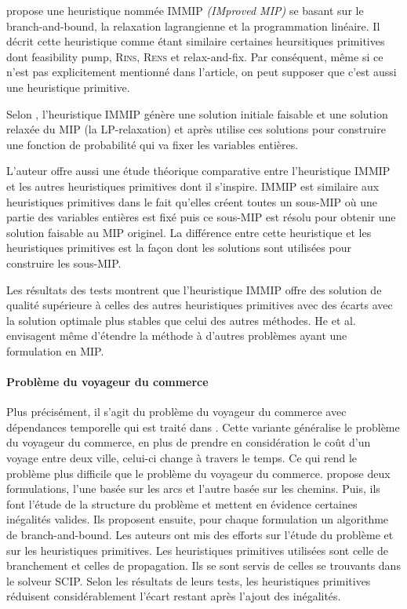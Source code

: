 \documentclass[12pt,a4paper,oneside]{book}
\theoremstyle{definition}
\begin{document}
            \cite{He2015} propose une heuristique nommée IMMIP \textit{(IMproved MIP)} se basant sur le branch-and-bound, la relaxation lagrangienne et la programmation linéaire. Il décrit cette heuristique comme étant similaire certaines heursitiques primitives dont feasibility pump, \textsc{Rins}, \textsc{Rens} et relax-and-fix. Par conséquent, même si ce n'est pas explicitement mentionné dans l'article, on peut supposer que c'est aussi une heuristique primitive.
          
            Selon \cite{He2015}, l'heuristique IMMIP génère une solution initiale faisable et une solution relaxée du MIP (la LP-relaxation) et après utilise ces solutions pour construire une fonction de probabilité qui va fixer les variables entières.
          
            L'auteur offre aussi une étude théorique comparative entre l'heuristique IMMIP et les autres heuristiques primitives dont il s'inspire. IMMIP est similaire aux heuristiques primitives dans le fait qu'elles créent toutes un sous-MIP où une partie des variables entières est fixé puis ce sous-MIP est résolu pour obtenir une solution faisable au MIP originel. La différence entre cette heuristique et les heuristiques primitives est la façon dont les solutions sont utilisées pour construire les sous-MIP.      
            
            Les résultats des tests montrent que l'heuristique IMMIP offre des solution de qualité supérieure à celles des autres heuristiques primitives avec des écarts avec la solution optimale plus stables que celui des autres méthodes. He et al. envisagent même d'étendre la méthode à d'autres problèmes ayant une formulation en MIP.
            
	    \paragraph{Problème du voyageur du commerce}
	    
	        Plus précisément, il s'agit du problème du voyageur du commerce avec dépendances temporelle qui est traité dans \cite{hansknecht2018cuts}. Cette variante généralise le problème du voyageur du commerce, en plus de prendre en considération le coût d'un voyage entre deux ville, celui-ci change à travers le temps. Ce qui rend le problème plus difficile que le problème du voyageur du commerce. \cite{hansknecht2018cuts} propose deux formulations, l'une basée sur les arcs et l'autre basée sur les chemins. Puis, ils font l'étude de la structure  du problème et mettent en évidence certaines inégalités valides. Ils proposent ensuite, pour chaque formulation un algorithme de branch-and-bound. Les auteurs ont mis des efforts sur l'étude du problème et sur les heuristiques primitives. Les heuristiques primitives utilisées sont celle de branchement et celles de propagation. Ils se sont servis de celles se trouvants dans le solveur SCIP. Selon les résultats de leurs tests, les heuristiques primitives réduisent considérablement l'écart restant après l'ajout des inégalités.
	    
\end{document}
